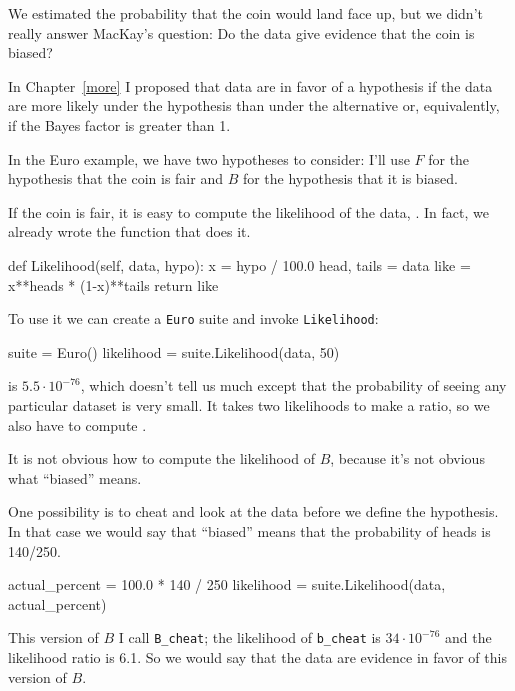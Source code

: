 \documentclass[12pt]{book}
\theoremstyle{exercise}
\begin{document}
We estimated the probability that the coin would
land face up, but we didn't really answer MacKay's question:
Do the data give evidence that the coin is biased?

In Chapter~\ref{more} I proposed that data are in favor of
a hypothesis if the data are more likely under the hypothesis than
under the alternative or, equivalently, if the Bayes factor is greater
than 1.

In the Euro example, we have two hypotheses to consider: I'll use
$F$ for the hypothesis that the coin is fair and $B$ for the hypothesis
that it is biased.

If the coin is fair, it is easy to compute the likelihood of the
data, .  In fact, we already wrote the function
that does it.

\begin{code}
    def Likelihood(self, data, hypo):
        x = hypo / 100.0
        head, tails = data
        like = x**heads * (1-x)**tails
        return like
\end{code}

To use it we can
create a {\tt Euro} suite and invoke
{\tt Likelihood}:

\begin{code}
    suite = Euro()
    likelihood = suite.Likelihood(data, 50)
\end{code}

 is $5.5 \cdot 10^{-76}$, which doesn't tell us much except
that the probability of seeing any particular dataset is very small.
It takes two likelihoods to make a ratio, so we also have to
compute .

It is not obvious how to compute the likelihood of $B$, because
it's not obvious what ``biased'' means.

One possibility is to cheat and look at the data before we define
the hypothesis.  In that case we would say that ``biased'' means that
the probability of heads is 140/250.

\begin{code}
    actual_percent = 100.0 * 140 / 250
    likelihood = suite.Likelihood(data, actual_percent)
\end{code}

This version of $B$ I call \verb"B_cheat"; the likelihood of
\verb"b_cheat" is $34 \cdot 10^{-76}$ and the likelihood ratio is
6.1.  So we would say that the data are evidence in favor of this
version of $B$.
\end{document}
